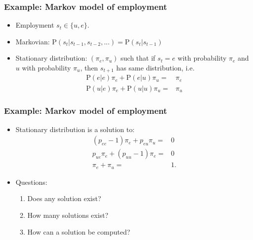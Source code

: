 \documentclass[compress]{beamer}
\def\Pr{\mathrm{P}}
\begin{document}
\begin{frame}
  \frametitle{Example: Markov model of employment}
  \begin{itemize} 
  \item Employment $s_t \in \{u, e\}$.
  \item Markovian: $\Pr(s_t | s_{t-1}, s_{t-2} , ... ) = \Pr(s_t|
    s_{t-1})$
  \item Stationary distribution: $(\pi_e, \pi_u)$ such that if $s_t = e$
    with probability $\pi_e$ and $u$ with probability $\pi_u$, then
    $s_{t+1}$ has same distribution, i.e.\ 
    \begin{align*}
       \Pr(e|e) \pi_e + \Pr(e|u) \pi_u = & \pi_e \\
       \Pr(u|e) \pi_e + \Pr(u|u) \pi_u = & \pi_u
    \end{align*}
  \end{itemize}
\end{frame}
\begin{frame}
  \frametitle{Example: Markov model of employment}
  \begin{itemize}
  \item Stationary distribution is a solution to:
  \begin{align*}
      (p_{ee}-1) \pi_e + p_{eu} \pi_u = & 0\\
      p_{ue} \pi_e + (p_{uu}-1) \pi_e= & 0\\
      \pi_e + \pi_u = & 1 .
    \end{align*}
  \item Questions:
    \begin{enumerate}
    \item Does any solution exist? 
    \item How many solutions exist?
    \item How can a solution be computed?
    \end{enumerate}    
  \end{itemize}
\end{frame}
\end{document}
